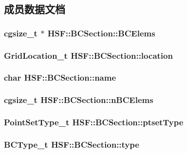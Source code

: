 \subsection{成员数据文档}
\hypertarget{structHSF_1_1BCSection_a3cb5281963ce7df85bb0651883d66d75}{
\subsubsection[{BCElems}]{\setlength{\rightskip}{0pt plus 5cm}cgsize\_\-t $\ast$ {\bf HSF::BCSection::BCElems}}}
\label{structHSF_1_1BCSection_a3cb5281963ce7df85bb0651883d66d75}
\hypertarget{structHSF_1_1BCSection_abb671197662a1806beb5965f89547a00}{
\subsubsection[{location}]{\setlength{\rightskip}{0pt plus 5cm}GridLocation\_\-t {\bf HSF::BCSection::location}}}
\label{structHSF_1_1BCSection_abb671197662a1806beb5965f89547a00}
\hypertarget{structHSF_1_1BCSection_a82fb0473e237f8fa0ffc44eef863fe57}{
\subsubsection[{name}]{\setlength{\rightskip}{0pt plus 5cm}char {\bf HSF::BCSection::name}}}
\label{structHSF_1_1BCSection_a82fb0473e237f8fa0ffc44eef863fe57}
\hypertarget{structHSF_1_1BCSection_a686d5a676d9ff20068c47ef14557fe4f}{
\subsubsection[{nBCElems}]{\setlength{\rightskip}{0pt plus 5cm}cgsize\_\-t {\bf HSF::BCSection::nBCElems}}}
\label{structHSF_1_1BCSection_a686d5a676d9ff20068c47ef14557fe4f}
\hypertarget{structHSF_1_1BCSection_a2e08a35e92dcffe93be2b3c6d02d1450}{
\subsubsection[{ptsetType}]{\setlength{\rightskip}{0pt plus 5cm}PointSetType\_\-t {\bf HSF::BCSection::ptsetType}}}
\label{structHSF_1_1BCSection_a2e08a35e92dcffe93be2b3c6d02d1450}
\hypertarget{structHSF_1_1BCSection_acc3e1b72196d3cbafc03146ae2485386}{
\subsubsection[{type}]{\setlength{\rightskip}{0pt plus 5cm}BCType\_\-t {\bf HSF::BCSection::type}}}
\label{structHSF_1_1BCSection_acc3e1b72196d3cbafc03146ae2485386}


